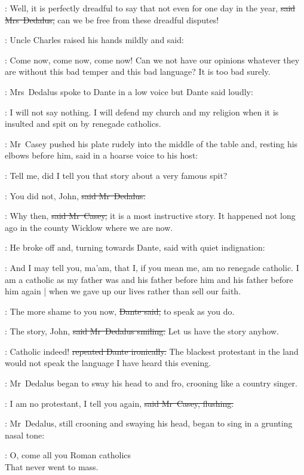 \marydedalus:
Well, it is perfectly dreadful
to say that not even for one day in the year,
\sout{said Mrs~Dedalus,}
can we be free from these dreadful disputes!

:
Uncle Charles raised his hands mildly and said:

\charles:
Come now, come now, come now!
Can we not have our opinions
whatever they are
without this bad temper and this bad language?
It is too bad surely.

:
Mrs~Dedalus spoke to Dante in a low voice
but Dante said loudly:

\dante:
I will not say nothing.
I will defend my church and my religion
when it is insulted and spit on
by renegade catholics.

:
Mr~Casey pushed his plate rudely
into the middle of the table
and, resting his elbows before him,
said in a hoarse voice to his host:

\casey:
Tell me, did I tell you that story
about a very famous spit?

\simon:
You did not, John,
\sout{said Mr~Dedalus.}

\casey:
Why then,
\sout{said Mr~Casey,}
it is a most instructive story.
It happened not long ago in the county Wicklow
where we are now.

:
He broke off
and, turning towards Dante,
said with quiet indignation:

\casey:
And I may tell you, ma’am,
that I, if you mean me,
am no renegade catholic.
I am a catholic as my father was
and his father before him
and his father before him again |
when we gave up our lives
rather than sell our faith.

\dante:
The more shame to you now,
\sout{Dante said,}
to speak as you do.

\simon:
The story, John,
\sout{said Mr~Dedalus smiling.}
Let us have the story anyhow.

\dante:
Catholic indeed!
\sout{repeated Dante ironically.}
The blackest protestant in the land
would not speak the language I have heard this evening.

:
Mr~Dedalus began to sway his head to and fro,
crooning like a country singer.

\casey:
I am no protestant,
I tell you again,
\sout{said Mr~Casey,
flushing.}

:
Mr~Dedalus,
still crooning and swaying his head,
began to sing in a grunting nasal tone:

\simon:
O, come all you Roman catholics \\
That never went to mass.

